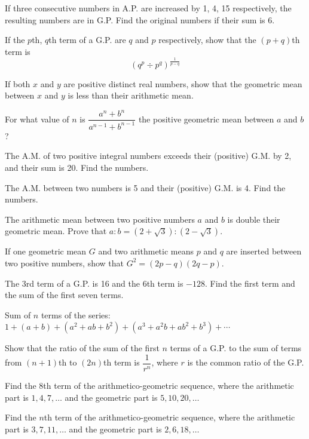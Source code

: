 \documentclass[11pt,a4paper]{article}
\begin{document}
\begin{longlist}
\item If three consecutive numbers in A.P. are increased by 1, 4, 15 respectively, the resulting numbers are in G.P. Find the original numbers if their sum is 6.

\item If the $p$th, $q$th term of a G.P. are $q$ and $p$ respectively, show that the $(p+q)$th term is
\[
(q^p \div p^q)^{\frac{1}{p-q}}
\]

\item If both $x$ and $y$ are positive distinct real numbers, show that the geometric mean between $x$ and $y$ is less than their arithmetic mean.

\item For what value of $n$ is $\dfrac{a^n+b^n}{a^{n-1}+b^{n-1}}$ the positive geometric mean between $a$ and $b$?

\item The A.M. of two positive integral numbers exceeds their (positive) G.M. by 2, and their sum is 20. Find the numbers.

\item The A.M. between two numbers is 5 and their (positive) G.M. is 4. Find the numbers.

\item The arithmetic mean between two positive numbers $a$ and $b$ is double their geometric mean. Prove that $a:b = (2+\sqrt3):(2-\sqrt3)$.

\item If one geometric mean $G$ and two arithmetic means $p$ and $q$ are inserted between two positive numbers, show that $G^2=(2p-q)(2q-p)$.

\item The 3rd term of a G.P. is 16 and the 6th term is $-128$. Find the first term and the sum of the first seven terms.

\item Sum of $n$ terms of the series: $1+(a+b)+(a^2+ab+b^2)+(a^3+a^2b+ab^2+b^3)+\cdots$

\item Show that the ratio of the sum of the first $n$ terms of a G.P. to the sum of terms from $(n+1)$th to $(2n)$th term is $\dfrac{1}{r^n}$, where $r$ is the common ratio of the G.P.

\item Find the 8th term of the arithmetico-geometric sequence, where the arithmetic part is $1, 4, 7, \ldots$ and the geometric part is $5, 10, 20, \ldots$

\item Find the $n$th term of the arithmetico-geometric sequence, where the arithmetic part is $3, 7, 11, \ldots$ and the geometric part is $2, 6, 18, \ldots$


\end{longlist}
\end{document}
